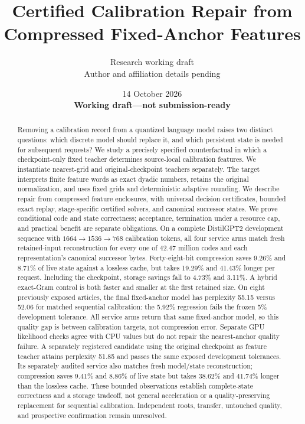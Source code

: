 \documentclass[10pt,twocolumn,letterpaper]{article}
\title{Certified Calibration Repair from Compressed Fixed-Anchor Features}
\author{Research working draft\\Author and affiliation details pending}
\date{14 October 2026\\\textbf{Working draft---not submission-ready}}
\begin{document}
\maketitle

\begin{abstract}
Removing a calibration record from a quantized language model raises two distinct
questions: which discrete model should replace it, and which persistent state is
needed for subsequent requests? We study a precisely specified counterfactual in
which a checkpoint-only fixed teacher determines source-local calibration
features. We instantiate nearest-grid and original-checkpoint teachers separately. The target interprets finite
feature words as exact dyadic numbers, retains the original normalization, and
uses fixed grids and deterministic adaptive rounding. We describe repair from
compressed feature enclosures, with universal decision certificates, bounded
exact replay, stage-specific certified solvers, and canonical successor states.
We prove conditional code and state correctness; acceptance, termination under a
resource cap, and practical benefit are separate obligations. On a complete
DistilGPT2 development sequence with $1664\to1536\to768$ calibration tokens,
all four service arms match fresh retained-input reconstruction for every one
of 42.47 million codes and each representation's canonical successor bytes.
Forty-eight-bit compression saves 9.26\% and 8.71\% of live state against a
lossless cache, but takes 19.29\% and 41.43\% longer per request. Including the
checkpoint, storage savings fall to 4.73\% and 3.11\%. A hybrid exact-Gram control
is both faster and smaller at the first retained size. On eight previously
exposed articles, the final fixed-anchor model has perplexity 55.15 versus 52.06
for matched sequential calibration: the 5.92\% regression fails the frozen
5\% development tolerance. All service arms return that same fixed-anchor
model, so this quality gap is between calibration targets, not compression
error. Separate GPU likelihood checks agree with CPU values but do not repair
the nearest-anchor quality failure. A separately registered candidate using the
original checkpoint as feature teacher attains perplexity 51.85 and passes the
same exposed development tolerances. Its separately audited service also matches
fresh model/state reconstruction; compression saves 9.41\% and 8.86\% of live
state but takes 38.62\% and 41.74\% longer than the lossless cache. These bounded
observations establish complete-state correctness and a storage tradeoff, not
general acceleration or a
quality-preserving replacement for sequential calibration. Independent roots,
transfer, untouched quality, and prospective confirmation remain unresolved.
\end{abstract}
\end{document}
